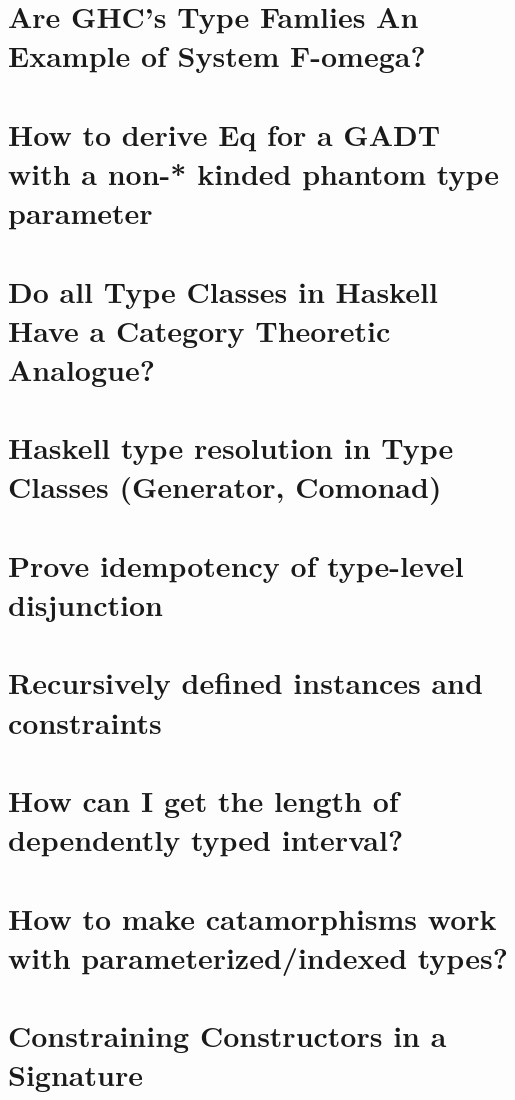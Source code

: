 \documentclass{book}%
\begin{document}
\section{Are GHC's Type Famlies An Example of System F-omega?}


\section{How to derive Eq for a GADT with a non-* kinded phantom type parameter}


\section{Do all Type Classes in Haskell Have a Category Theoretic Analogue?}


\section{Haskell type resolution in Type Classes (Generator, Comonad)}


\section{Prove idempotency of type-level disjunction}


\section{Recursively defined instances and constraints}


\section{How can I get the length of dependently typed interval?}


\section{How to make catamorphisms work with parameterized/indexed types?}


\section{Constraining Constructors in a Signature}

\end{document}
